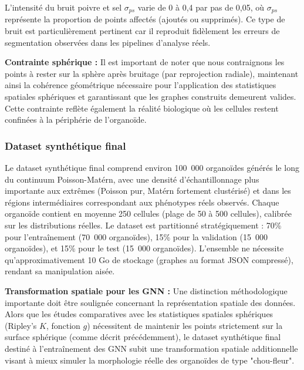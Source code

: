 L'intensité du bruit poivre et sel $\sigma_{ps}$ varie de 0 à 0,4 par pas de 0,05, où $\sigma_{ps}$ représente la proportion de points affectés (ajoutés ou supprimés). Ce type de bruit est particulièrement pertinent car il reproduit fidèlement les erreurs de segmentation observées dans les pipelines d'analyse réels.

\textbf{Contrainte sphérique :}
Il est important de noter que nous contraignons les points à rester sur la sphère après bruitage (par reprojection radiale), maintenant ainsi la cohérence géométrique nécessaire pour l'application des statistiques spatiales sphériques et garantissant que les graphes construits demeurent valides. Cette contrainte reflète également la réalité biologique où les cellules restent confinées à la périphérie de l'organoïde.

\subsubsection{Dataset synthétique final}
\label{sec:dataset_final}

Le dataset synthétique final comprend environ 100~000 organoïdes générés le long du continuum Poisson-Matérn, avec une densité d'échantillonnage plus importante aux extrêmes (Poisson pur, Matérn fortement clustérisé) et dans les régions intermédiaires correspondant aux phénotypes réels observés. Chaque organoïde contient en moyenne 250 cellules (plage de 50 à 500 cellules), calibrée sur les distributions réelles. Le dataset est partitionné stratégiquement : 70\% pour l'entraînement (70~000 organoïdes), 15\% pour la validation (15~000 organoïdes), et 15\% pour le test (15~000 organoïdes). L'ensemble ne nécessite qu'approximativement 10 Go de stockage (graphes au format JSON compressé), rendant sa manipulation aisée.

\textbf{Transformation spatiale pour les GNN :}
Une distinction méthodologique importante doit être soulignée concernant la représentation spatiale des données. Alors que les études comparatives avec les statistiques spatiales sphériques (Ripley's $K$, fonction $g$) nécessitent de maintenir les points strictement sur la surface sphérique (comme décrit précédemment), le dataset synthétique final destiné à l'entraînement des GNN subit une transformation spatiale additionnelle visant à mieux simuler la morphologie réelle des organoïdes de type "chou-fleur".

